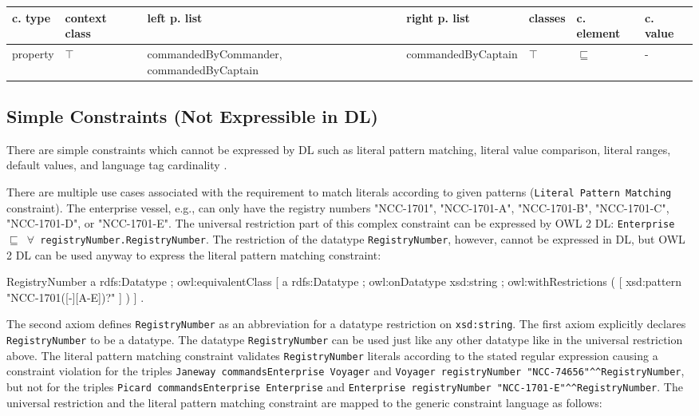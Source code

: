\documentclass{llncs}
\newcommand{\ms}[1]{\texttt{#1}}
\newenvironment{gcotable}{
  \scriptsize
  \sffamily
  \vspace{0.3cm}
	\begin{center}
  \begin{tabular}{l|l|l|l|l|l|l}
  \hline
  \textbf{c. type} & \textbf{context class} & \textbf{left p. list} & \textbf{right p. list} & \textbf{classes} & \textbf{c. element} & \textbf{c. value} \\
  \hline

}{
  \hline
  \end{tabular}
	\end{center}
}
\begin{document}
\begin{gcotable}
property & $\top$ & commandedByCommander, commandedByCaptain & commandedByCaptain & $\top$ & $\sqsubseteq$ & - \\
\end{gcotable}

\subsection{Simple Constraints (Not Expressible in DL)}

There are simple constraints which cannot be expressed by DL such as literal pattern matching, literal value comparison, literal ranges, default values, and language tag cardinality \cite{BoschNolleAcarEckert2015}.


There are multiple use cases associated with the requirement to match literals according to given patterns (\ms{Literal Pattern Matching} constraint).
The enterprise vessel, e.g.,  can only have the registry numbers "NCC-1701", "NCC-1701-A", "NCC-1701-B", "NCC-1701-C", "NCC-1701-D", or "NCC-1701-E".
The universal restriction part of this complex constraint can be expressed by OWL 2 DL:
\ms{Enterprise $\sqsubseteq$ $\forall$ registryNumber.RegistryNumber}.
The restriction of the datatype \ms{RegistryNumber}, however, cannot be expressed in DL, but OWL 2 DL can be used anyway to express the literal pattern matching constraint:

\begin{ex}
RegistryNumber
    a rdfs:Datatype ;
    owl:equivalentClass [
        a rdfs:Datatype ;
        owl:onDatatype xsd:string ;
        owl:withRestrictions ( 
            [ xsd:pattern "NCC-1701([-][A-E])?" ] ) ] .
\end{ex}

The second axiom defines \ms{RegistryNumber} as an abbreviation for a datatype restriction on \ms{xsd:string}. 
The first axiom explicitly declares \ms{RegistryNumber} to be a datatype. 
The datatype \ms{RegistryNumber} can be used just like any other datatype like in the universal restriction above.
The literal pattern matching constraint validates \ms{RegistryNumber} literals according to the stated regular expression causing a constraint violation for the triples 
\ms{Janeway commandsEnterprise Voyager} and \ms{Voyager registryNumber "NCC-74656"\textasciicircum{}\textasciicircum{}RegistryNumber}, 
but not for the triples \ms{Picard commandsEnterprise Enterprise} and \ms{Enterprise registryNumber "NCC-1701-E"\textasciicircum{}\textasciicircum{}RegistryNumber}.
The universal restriction and the literal pattern matching constraint are mapped to the generic constraint language as follows:
\end{document}
